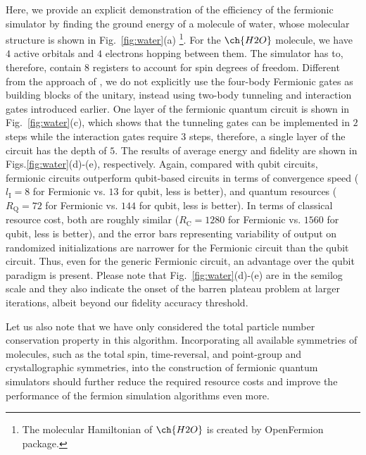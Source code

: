 \documentclass[aps, prx, reprint, superscriptaddress]{revtex4-2}
\begin{document}
Here, we provide an explicit demonstration of the efficiency of the fermionic simulator by finding the ground energy of a molecule of water, whose molecular structure is shown in Fig.~\ref{fig:water}(a) \footnote{The molecular Hamiltonian of $\ch{H2O}$ is created by OpenFermion package.}. For the $\ch{H2O}$ molecule, we have $4$ active orbitals and $4$ electrons hopping between them. The simulator has to, therefore, contain $8$ registers to account for spin degrees of freedom. Different from the approach of \cite{gonzalez2023fermionic}, we do not explicitly use the four-body Fermionic gates as building blocks of the unitary, instead using two-body tunneling and interaction gates introduced earlier. One layer of the fermionic quantum circuit is shown in Fig.~\ref{fig:water}(c), which shows that the tunneling gates can be implemented in $2$ steps while the interaction gates require $3$ steps, therefore, a single layer of the circuit has the depth of $5$. The results of average energy and fidelity are shown in Figs.\ref{fig:water}(d)-(e), respectively. Again, compared with qubit circuits, fermionic circuits outperform qubit-based circuits in terms of convergence speed ($l_\text{I}= 8$ for Fermionic vs. $13$ for qubit, less is better), and quantum resources ($R_\text{Q}= 72$ for Fermionic vs. $144$ for qubit, less is better). In terms of classical resource cost, both are roughly similar ($R_\text{C}= 1280$ for Fermionic vs. $1560$ for qubit, less is better), and the error bars representing variability of output on randomized initializations are narrower for the Fermionic circuit than the qubit circuit. Thus, even for the generic Fermionic circuit, an advantage over the qubit paradigm is present. Please note that Fig.~\ref{fig:water}(d)-(e) are in the semilog scale and they also indicate the onset of the barren plateau problem at larger iterations, albeit beyond our fidelity accuracy threshold.
 
Let us also note that we have only considered the total particle number conservation property in this algorithm. Incorporating all available symmetries of molecules, such as the total spin, time-reversal, and point-group and crystallographic symmetries, into the construction of fermionic quantum simulators should further reduce the required resource costs and improve the performance of the fermion simulation algorithms even more. 
\\
\end{document}
